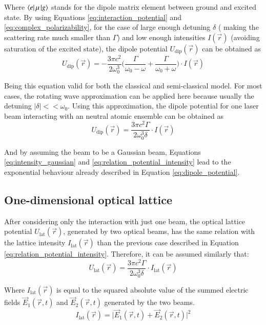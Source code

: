Where $\bra{e}\mu\ket{g}$ stands for the dipole matrix element between ground and excited state. By using Equations \eqref{eq:interaction_potential} and \eqref{eq:complex_polarizability}, for the case of large enough detuning $\delta$ ( making the scattering rate much smaller than $\Gamma$) and low enough intensities $I(\vec{r})$ (avoiding saturation of the excited state), the dipole potential $U_{\text{dip}}(\vec{r})$ can be obtained as
\begin{equation}
	U_{\text{dip}}(\vec{r}) = -\frac{3\pi c^2}{2\omega_0^3} \bigg(\frac{\Gamma}{\omega_0-\omega} + \frac{\Gamma}{\omega_0+\omega}\bigg) \cdot I(\vec{r})
\end{equation} 

Being this equation valid for both the classical and semi-classical model. For most cases, the rotating wave approximation can be applied here because usually the detuning $\mathopen|\delta\mathclose| << \omega_0$. Using this approximation, the dipole potential for one laser beam interacting with an neutral atomic ensemble can be obtained as
\begin{equation}\label{eq:relation_potential_intensity}
	U_{\text{dip}}(\vec{r}) = \frac{3\pi c^2 \Gamma}{2\omega_0^3 \delta} \cdot I(\vec{r})
\end{equation} 

And by assuming the beam to be a Gaussian beam, Equations \eqref{eq:intensity_gaussian} and \eqref{eq:relation_potential_intensity} lead to the exponential behaviour already described in Equation \eqref{eq:dipole_potential}.

\pagebreak

\subsection{One-dimensional optical lattice}

After considering only the interaction with just one beam, the optical lattice potential $U_\text{lat}(\vec{r})$, generated by two optical beams, has the same relation with the lattice intensity $I_\text{lat}(\vec{r})$ than the previous case described in Equation \eqref{eq:relation_potential_intensity}. Therefore, it can be assumed similarly that:
\begin{equation}\label{eq:relation_lattice_potential_intensity}
	U_{\text{lat}}(\vec{r}) = \frac{3\pi c^2 \Gamma}{2\omega_0^3 \delta} \cdot I_{\text{lat}}(\vec{r})
\end{equation} 

Where $I_\text{lat}(\vec{r})$ is equal to the squared absolute value of the summed electric fields $\vec{E}_1(\vec{r}, t)$ and $\vec{E}_2(\vec{r}, t)$ generated by the two beams. 
\begin{equation}\label{eq:relation_lattice_inesity_fields}
	I_{\text{lat}}(\vec{r}) = \mathopen\big|\vec{E}_1(\vec{r}, t)+\vec{E}_2(\vec{r}, t)\mathclose\big|^2
\end{equation}

